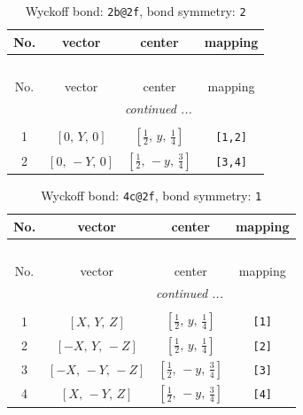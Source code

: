 \documentclass[fleqn,8pt]{jsarticle}
\begin{document}
\renewcommand{\arraystretch}{1.2}
\begin{longtable}{cccc}
\caption{Wyckoff bond: {\tt 2b@2f}, bond symmetry: {\tt 2}}
 \\
 \hline \hline
No. & vector & center & mapping \\ \hline \endfirsthead

\multicolumn{3}{l}{\tablename\ \thetable{}} \\
 \hline \hline
No. & vector & center & mapping \\ \hline \endhead

 \hline \hline
\multicolumn{3}{r}{\footnotesize\it continued ...} \\ \endfoot

 \hline \hline
\multicolumn{3}{r}{} \\ \endlastfoot

1 & $\left[ 0,\, Y,\, 0 \right]$ & $\left[ \frac{1}{2},\, y,\, \frac{1}{4} \right]$ & {\tt [1,2]} \\ \hline
2 & $\left[ 0,\, - Y,\, 0 \right]$ & $\left[ \frac{1}{2},\, - y,\, \frac{3}{4} \right]$ & {\tt [3,4]} \\
\end{longtable}
\renewcommand{\arraystretch}{1.2}
\begin{longtable}{cccc}
\caption{Wyckoff bond: {\tt 4c@2f}, bond symmetry: {\tt 1}}
 \\
 \hline \hline
No. & vector & center & mapping \\ \hline \endfirsthead

\multicolumn{3}{l}{\tablename\ \thetable{}} \\
 \hline \hline
No. & vector & center & mapping \\ \hline \endhead

 \hline \hline
\multicolumn{3}{r}{\footnotesize\it continued ...} \\ \endfoot

 \hline \hline
\multicolumn{3}{r}{} \\ \endlastfoot

1 & $\left[ X,\, Y,\, Z \right]$ & $\left[ \frac{1}{2},\, y,\, \frac{1}{4} \right]$ & {\tt [1]} \\ \hline
2 & $\left[ - X,\, Y,\, - Z \right]$ & $\left[ \frac{1}{2},\, y,\, \frac{1}{4} \right]$ & {\tt [2]} \\ \hline
3 & $\left[ - X,\, - Y,\, - Z \right]$ & $\left[ \frac{1}{2},\, - y,\, \frac{3}{4} \right]$ & {\tt [3]} \\ \hline
4 & $\left[ X,\, - Y,\, Z \right]$ & $\left[ \frac{1}{2},\, - y,\, \frac{3}{4} \right]$ & {\tt [4]} \\
\end{longtable}
\end{document}
